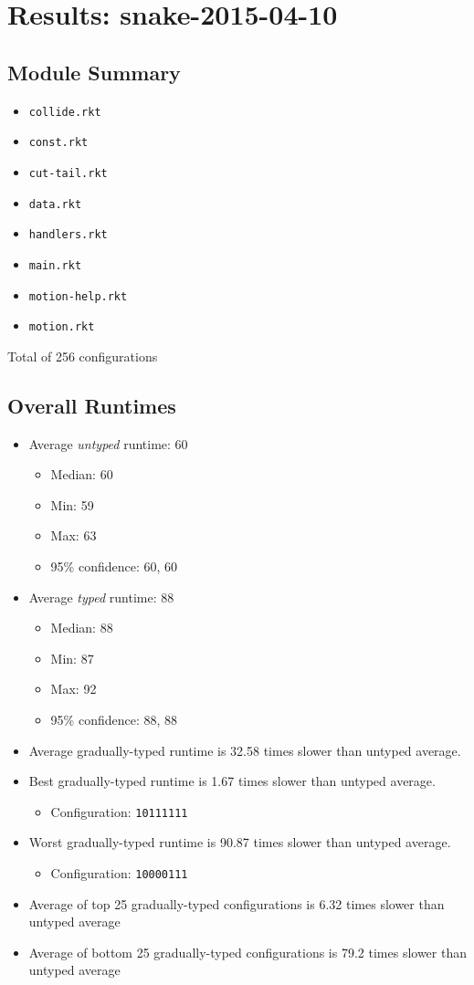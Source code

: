 \documentclass{article}
\newcommand{\mono}[1]{\texttt{#1}}
\begin{document}
\section{Results: snake-2015-04-10}

\subsection{Module Summary}
\begin{itemize}
\item \mono{collide.rkt}
\item \mono{const.rkt}
\item \mono{cut-tail.rkt}
\item \mono{data.rkt}
\item \mono{handlers.rkt}
\item \mono{main.rkt}
\item \mono{motion-help.rkt}
\item \mono{motion.rkt}\end{itemize}
Total of 256 configurations

\subsection{Overall Runtimes}
\begin{itemize}
\item Average \emph{untyped} runtime: 60
  \begin{itemize}
  \item Median: 60
  \item Min: 59
  \item Max: 63
  \item 95\% confidence: 60, 60
  \end{itemize}
\item Average \emph{typed} runtime: 88
  \begin{itemize}
  \item Median: 88
  \item Min: 87
  \item Max: 92
  \item 95\% confidence: 88, 88
  \end{itemize}
\item Average gradually-typed runtime is 32.58 times slower than untyped average.
\item Best gradually-typed runtime is 1.67 times slower than untyped average.
\begin{itemize}\item Configuration: \mono{10111111}\end{itemize}
\item Worst gradually-typed runtime is 90.87 times slower than untyped average.
\begin{itemize}\item Configuration: \mono{10000111}\end{itemize}
\item Average of top 25 gradually-typed configurations is 6.32 times slower than untyped average
\item Average of bottom 25 gradually-typed configurations is 79.2 times slower than untyped average
\end{itemize}
\end{document}
